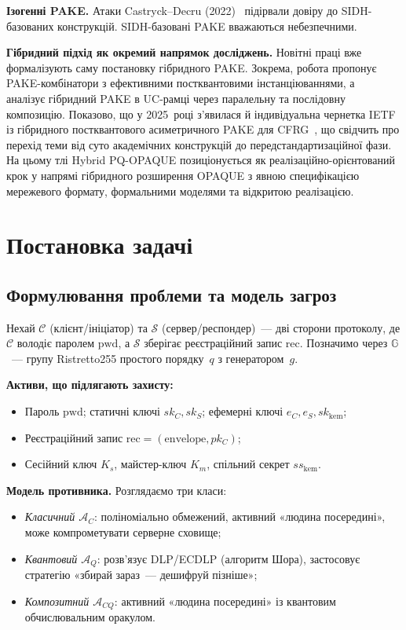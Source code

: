 \documentclass{llncs}
\begin{document}
\textbf{Ізогенні PAKE.} Атаки Castryck--Decru (2022)~\cite{castryck2023}
підірвали довіру до SIDH-базованих конструкцій. SIDH-базовані PAKE
вважаються небезпечними.

\textbf{Гібридний підхід як окремий напрямок досліджень.} Новітні праці
вже формалізують саму постановку гібридного PAKE. Зокрема, робота
\cite{hesse2024} пропонує PAKE-комбінатори з ефективними
постквантовими інстанціюваннями, а~\cite{lyu2024hybrid} аналізує
гібридний PAKE в UC-рамці через паралельну та послідовну композицію.
Показово, що у 2025~році з'явилася й індивідуальна чернетка IETF
із гібридного постквантового асиметричного PAKE для CFRG~\cite{vos2025},
що свідчить про перехід теми від суто академічних конструкцій до
передстандартизаційної фази. На цьому тлі Hybrid PQ-OPAQUE
позиціонується як реалізаційно-орієнтований крок у напрямі гібридного
розширення OPAQUE з явною специфікацією мережевого формату,
формальними моделями та відкритою реалізацією.

\section{Постановка задачі}

\subsection{Формулювання проблеми та модель загроз}

Нехай $\mathcal{C}$ (клієнт/ініціатор) та $\mathcal{S}$
(сервер/респондер)~--- дві сторони протоколу, де $\mathcal{C}$ володіє
паролем $\mathrm{pwd}$, а $\mathcal{S}$ зберігає реєстраційний запис
$\mathrm{rec}$. Позначимо через $\mathbb{G}$~--- групу Ristretto255
простого порядку~$q$ з генератором~$g$.

\textbf{Активи, що підлягають захисту:}
\begin{itemize}
  \item Пароль $\mathrm{pwd}$; статичні ключі $sk_C, sk_S$; ефемерні
        ключі $e_C, e_S, sk_{\mathrm{kem}}$;
  \item Реєстраційний запис $\mathrm{rec} = (\mathrm{envelope}, pk_C)$;
  \item Сесійний ключ $K_s$, майстер-ключ $K_m$, спільний секрет
        $ss_{\mathrm{kem}}$.
\end{itemize}

\textbf{Модель противника.} Розглядаємо три класи:
\begin{itemize}
  \item \emph{Класичний $\mathcal{A}_C$}: поліноміально обмежений,
        активний «людина посередині», може компрометувати серверне
        сховище;
  \item \emph{Квантовий $\mathcal{A}_Q$}: розв'язує DLP/ECDLP (алгоритм
        Шора), застосовує стратегію «збирай зараз~--- дешифруй пізніше»;
  \item \emph{Композитний $\mathcal{A}_{CQ}$}: активний «людина
        посередині» із квантовим обчислювальним оракулом.
\end{itemize}
\end{document}
